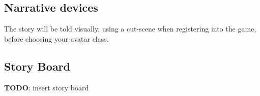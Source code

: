 \subsection{Narrative devices}

The story will be told visually, using a cut-scene when registering into the game, before choosing your avatar class.\\

\subsection{Story Board}
\textbf{TODO}: insert story board

\pagebreak 